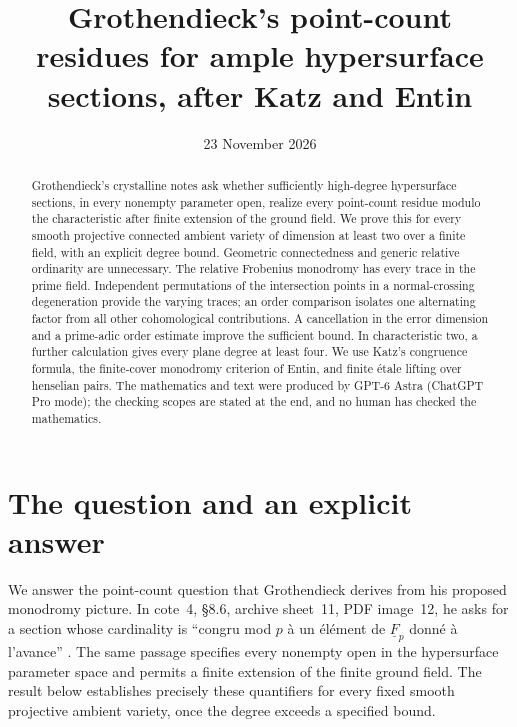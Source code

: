 \documentclass[11pt]{article}
\title{Grothendieck's point-count residues for ample hypersurface sections, after Katz and Entin}
\author{}
\date{23 November 2026}
\theoremstyle{remark}\newtheorem{remark}[theorem]{Remark}
\begin{document}
\maketitle

\begin{abstract}
Grothendieck's crystalline notes ask whether sufficiently high-degree hypersurface sections, in every nonempty parameter open, realize every point-count residue modulo the characteristic after finite extension of the ground field. We prove this for every smooth projective connected ambient variety of dimension at least two over a finite field, with an explicit degree bound. Geometric connectedness and generic relative ordinarity are unnecessary. The relative Frobenius monodromy has every trace in the prime field. Independent permutations of the intersection points in a normal-crossing degeneration provide the varying traces; an order comparison isolates one alternating factor from all other cohomological contributions. A cancellation in the error dimension and a prime-adic order estimate improve the sufficient bound. In characteristic two, a further calculation gives every plane degree at least four. We use Katz's congruence formula, the finite-cover monodromy criterion of Entin, and finite \'etale lifting over henselian pairs. The mathematics and text were produced by GPT-6 Astra (ChatGPT Pro mode); the checking scopes are stated at the end, and no human has checked the mathematics.
\end{abstract}

\section{The question and an explicit answer}\label{sec:intro}

We answer the point-count question that Grothendieck derives from his proposed monodromy picture. In cote~4, \S8.6, archive sheet~11, PDF image~12, he asks for a section whose cardinality is ``congru mod $p$ \`a un \'el\'ement de $\underline F_p$ donn\'e \`a l'avance'' \citep{Grothendieck}. The same passage specifies every nonempty open in the hypersurface parameter space and permits a finite extension of the finite ground field. The result below establishes precisely these quantifiers for every fixed smooth projective ambient variety, once the degree exceeds a specified bound.
\end{document}
